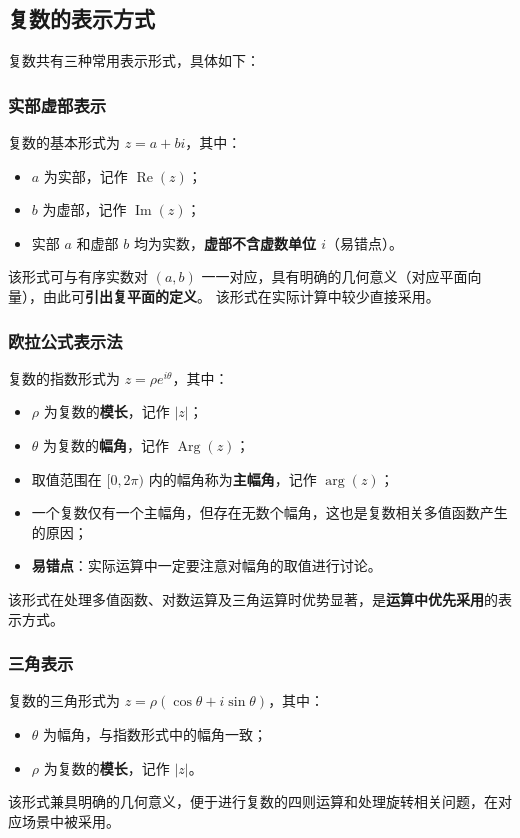 \documentclass{article}
\begin{document}
	\subsection{复数的表示方式}
	复数共有三种常用表示形式，具体如下：
	
	\subsubsection{实部虚部表示}
	复数的基本形式为 $z=a+bi$，其中：
	\begin{itemize}[leftmargin=2em, itemsep=0.3em]
		\item $a$ 为实部，记作 $\operatorname{Re}(z)$；
		\item $b$ 为虚部，记作 $\operatorname{Im}(z)$；
		\item 实部 $a$ 和虚部 $b$ 均为实数，\textbf{虚部不含虚数单位 $i$}（易错点）。
	\end{itemize}
	该形式可与有序实数对 $(a,b)$ 一一对应，具有明确的几何意义（对应平面向量），由此可\textbf{引出复平面的定义}。
	该形式在实际计算中较少直接采用。
	
	\subsubsection{欧拉公式表示法}
	复数的指数形式为 $z=\rho e^{i\theta}$，其中：
	\begin{itemize}[leftmargin=2em, itemsep=0.3em]
		\item $\rho$ 为复数的\textbf{模长}，记作 $|z|$；
		\item $\theta$ 为复数的\textbf{幅角}，记作 $\operatorname{Arg}(z)$；
		\item 取值范围在 $[0,2\pi)$ 内的幅角称为\textbf{主幅角}，记作 $\arg(z)$；
		\item 一个复数仅有一个主幅角，但存在无数个幅角，这也是复数相关多值函数产生的原因；
		\item \textbf{易错点}：实际运算中一定要注意对幅角的取值进行讨论。
	\end{itemize}
	该形式在处理多值函数、对数运算及三角运算时优势显著，是\textbf{运算中优先采用}的表示方式。
	
	\subsubsection{三角表示}
	复数的三角形式为 $z=\rho(\cos\theta+i\sin\theta)$，其中：
	\begin{itemize}[leftmargin=2em, itemsep=0.3em]
		\item $\theta$ 为幅角，与指数形式中的幅角一致；
		\item $\rho$ 为复数的\textbf{模长}，记作 $|z|$。
	\end{itemize}
	该形式兼具明确的几何意义，便于进行复数的四则运算和处理旋转相关问题，在对应场景中被采用。
	
\end{document}
